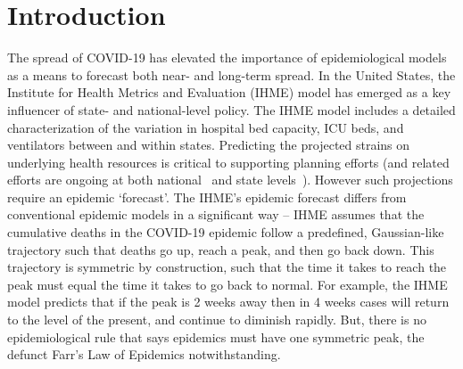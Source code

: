 \section{Introduction}
The spread of COVID-19 has elevated the importance of epidemiological
models as a means to forecast both near- and long-term spread. 
In the United States, the Institute for Health Metrics and Evaluation (IHME)
model has emerged as a key influencer of state- and national-level
policy.  The IHME model includes a detailed characterization
of the variation in
hospital bed capacity, ICU beds, and ventilators between and within
states. Predicting the projected strains on underlying
health resources
 is critical to supporting planning efforts (and related
efforts are ongoing at both national~\citep{meyers} and
state levels~\citep{upenn}).  However such projections require
an epidemic `forecast'.  The IHME's epidemic forecast
differs from conventional
epidemic models in a significant way -- IHME assumes
that the cumulative deaths in the COVID-19 epidemic
follow a predefined, Gaussian-like trajectory 
such that deaths go up, reach a peak,
and then go back down.  This trajectory is symmetric
by construction, such that the time it takes to reach the peak 
must equal the time it takes to go back to normal.  For example, the 
IHME model predicts that if the peak is 2 weeks away then in 4 weeks
cases will return to the level of the present, and continue
to diminish rapidly.  But, there is no epidemiological rule
that says epidemics must have one symmetric peak, 
the defunct Farr's Law of Epidemics notwithstanding. 

